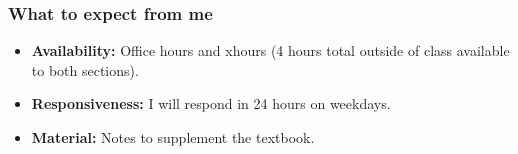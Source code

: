 \documentclass[serif,mathserif]{beamer}
\begin{document}
\begin{frame} 
\frametitle{What to expect from me}

\begin{itemize}
\item {\bf Availability:} Office hours and xhours (4 hours total outside of class available to both sections).
\item {\bf Responsiveness:} I will respond in 24 hours on weekdays. 
\item {\bf Material:} Notes to supplement the textbook. 
\end{itemize}


\end{frame}
\end{document}
